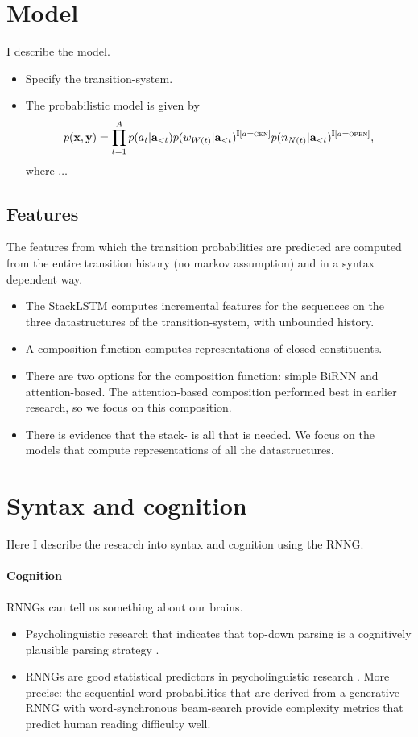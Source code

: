 

\section{Model}
I describe the model.
\begin{itemize}
  \item Specify the transition-system.
  \item The probabilistic model is given by
  \begin{equation}
    p(\mathbf{x}, \mathbf{y}) = \prod_{t=1}^A p(a_t | \mathbf{a}_{<t}) p(w_{W(t)} | \mathbf{a}_{<t} )^{ \mathbb{I}[a = \textsc{gen}] } p(n_{N(t)} | \mathbf{a}_{<t} )^{ \mathbb{I}[a = \textsc{open}] },
  \end{equation}
  where $\dots$
\end{itemize}

\subsection{Features}
The features from which the transition probabilities are predicted are computed from the entire transition history (no markov assumption) and in a syntax dependent way.
\begin{itemize}
  \item The StackLSTM computes incremental features for the sequences on the three datastructures of the transition-system, with unbounded history.
  \item A composition function computes representations of closed constituents.
  \item There are two options for the composition function: simple BiRNN and attention-based. The attention-based composition performed best in earlier research, so we focus on this composition.
  \item There is evidence that the stack- is all that is needed. We focus on the models that compute representations of all the datastructures.
\end{itemize}

\section{Syntax and cognition}
Here I describe the research into syntax and cognition using the RNNG.

\paragraph{Cognition} RNNGs can tell us something about our brains.
\begin{itemize}
  \item Psycholinguistic research that indicates that top-down parsing is a cognitively plausible parsing strategy \citep{Brennan+2016}.
  \item RNNGs are good statistical predictors in psycholinguistic research \citep{Hale+2018:beam}. More precise: the sequential word-probabilities that are derived from a generative RNNG with word-synchronous beam-search \citep{Stern+2017:beam} provide complexity metrics that predict human reading difficulty well.
\end{itemize}

